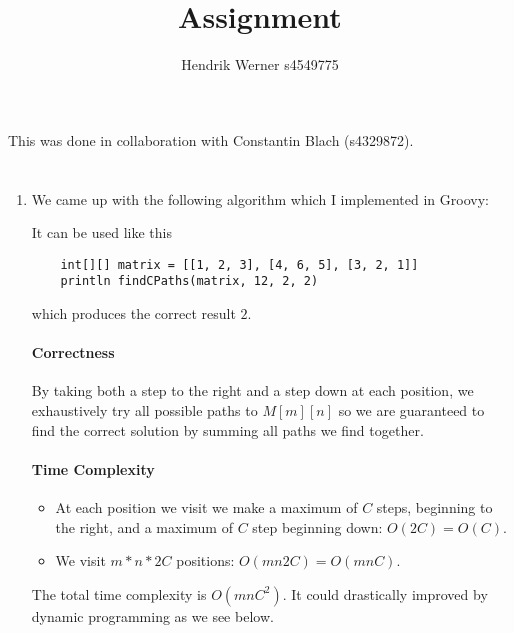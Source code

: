 \documentclass[12pt, a4paper]{article}
\title{Assignment}
\author{Hendrik Werner s4549775}
\begin{document}
\maketitle

This was done in collaboration with Constantin Blach (s4329872).

\section{} %

\section{} %
\begin{enumerate}[a]
	\item %
	We came up with the following algorithm which I implemented in Groovy:

	

	It can be used like this

	\begin{lstlisting}
	int[][] matrix = [[1, 2, 3], [4, 6, 5], [3, 2, 1]]
	println findCPaths(matrix, 12, 2, 2)
	\end{lstlisting}

	which produces the correct result $2$.

	\paragraph{Correctness}

	By taking both a step to the right and a step down at each position, we exhaustively try all possible paths to $M[m][n]$ so we are guaranteed to find the correct solution by summing all paths we find together.

	\paragraph{Time Complexity}

	\begin{itemize}
		\item At each position we visit we make a maximum of $C$ steps, beginning to the right, and a maximum of $C$ step beginning down: $O(2C) = O(C)$.
		\item We visit $m * n * 2C$ positions: $O(mn2C) = O(mnC)$.
	\end{itemize}

	The total time complexity is $O(mnC^2)$. It could drastically improved by dynamic programming as we see below.


\end{enumerate}
\end{document}
